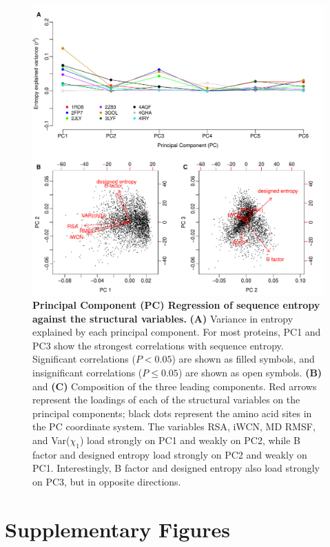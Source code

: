 \documentclass[12pt]{article}
\begin{document}
\begin{figure}[tbh]
\begin{center}
       \includegraphics[width=6.5in]{PC_screen_entropy.pdf}
\end{center}
\caption{\textbf{Principal Component (PC) Regression of sequence entropy against the structural variables.} {\bf (A)} Variance in entropy explained by each principal component. For most proteins, PC1 and PC3 show the strongest correlations with sequence entropy. Significant correlations ($P<0.05$) are shown as filled symbols, and insignificant correlations ($P\leq0.05$) are shown as open symbols. {\bf (B)} and {\bf (C)} Composition of the three leading components. Red arrows represent the loadings of each of the structural variables on the principal components; black dots represent the amino acid sites in the PC coordinate system. The variables RSA, iWCN, MD RMSF, and Var($\chi_1$) load strongly on PC1 and weakly on PC2, while B factor and designed entropy load strongly on PC2 and weakly on PC1. Interestingly, B factor and designed entropy also load strongly on PC3, but in opposite directions.}
\label{fig:cor_entropy_PC_screen}
\end{figure}


\cleardoublepage

\newpage
\section*{Supplementary Figures}
\end{document}
